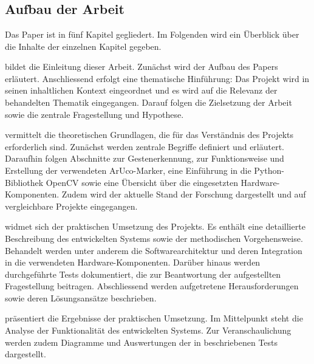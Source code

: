 \chapter{\chapOne}
\label{cha:chapter1} %

\begingroup
\fontsize{12pt}{14pt}\selectfont

\section{Aufbau der Arbeit}
Das Paper \textit{\maTitle} ist in fünf Kapitel gegliedert.
Im Folgenden wird ein Überblick über die Inhalte der einzelnen Kapitel gegeben.

 bildet die Einleitung dieser Arbeit.
Zunächst wird der Aufbau des Papers erläutert.
Anschliessend erfolgt eine thematische Hinführung: Das Projekt wird in seinen inhaltlichen Kontext eingeordnet und es wird auf die Relevanz der behandelten Thematik eingegangen.
Darauf folgen die Zielsetzung der Arbeit sowie die zentrale Fragestellung und Hypothese.

 vermittelt die theoretischen Grundlagen, die für das Verständnis des Projekts erforderlich sind.
Zunächst werden zentrale Begriffe definiert und erläutert.
Daraufhin folgen Abschnitte zur Gestenerkennung, zur Funktionsweise und Erstellung der verwendeten ArUco-Marker, eine Einführung in die Python-Bibliothek OpenCV sowie eine Übersicht über die eingesetzten Hardware-Komponenten.
Zudem wird der aktuelle Stand der Forschung dargestellt und auf vergleichbare Projekte eingegangen.

 widmet sich der praktischen Umsetzung des Projekts.
Es enthält eine detaillierte Beschreibung des entwickelten Systems sowie der methodischen Vorgehensweise.
Behandelt werden unter anderem die Softwarearchitektur und deren Integration in die verwendeten Hardware-Komponenten.
Darüber hinaus werden durchgeführte Tests dokumentiert, die zur Beantwortung der aufgestellten Fragestellung beitragen.
Abschliessend werden aufgetretene Herausforderungen sowie deren Lösungsansätze beschrieben.

 präsentiert die Ergebnisse der praktischen Umsetzung.
Im Mittelpunkt steht die Analyse der Funktionalität des entwickelten Systems.
Zur Veranschaulichung werden zudem Diagramme und Auswertungen der in  beschriebenen Tests dargestellt.

